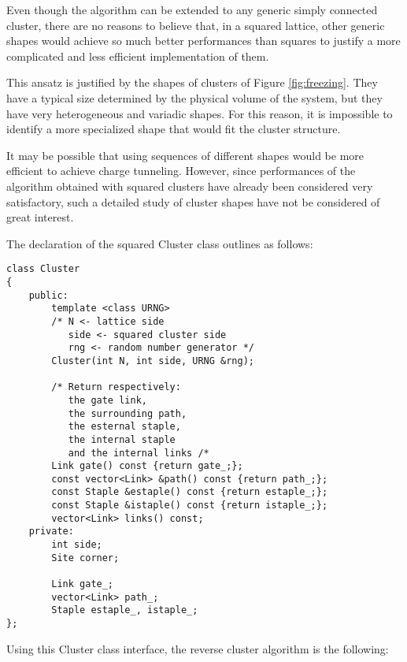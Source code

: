 Even though the algorithm can be extended to any generic simply connected cluster,
there are no reasons to believe that, in a squared lattice,
other generic shapes would achieve so much better performances than squares
to justify a more complicated and less efficient implementation of them.

This ansatz is justified by the shapes of clusters of Figure \ref{fig:freezing}.
They have a typical size determined by the physical volume of the system,
but they have very heterogeneous and variadic shapes. 
For this reason,
it is impossible to identify a more specialized shape that would fit the cluster structure.

It may be possible that using sequences of different shapes would be more efficient to achieve charge tunneling.
However, since performances of the algorithm obtained with squared clusters have already been considered very satisfactory,
such a detailed study of cluster shapes have not be considered of great interest.

The declaration of the squared {\ttfamily Cluster} class outlines as follows:

\begin{lstlisting}[caption={Cluster class declaration}]
class Cluster
{
    public:
        template <class URNG>
        /* N <- lattice side
           side <- squared cluster side
           rng <- random number generator */
        Cluster(int N, int side, URNG &rng);

        /* Return respectively:
           the gate link,
           the surrounding path,
           the esternal staple,
           the internal staple
           and the internal links /*
        Link gate() const {return gate_;};
        const vector<Link> &path() const {return path_;};
        const Staple &estaple() const {return estaple_;};
        const Staple &istaple() const {return istaple_;};
        vector<Link> links() const;
    private:
        int side;
        Site corner;

        Link gate_;
        vector<Link> path_;
        Staple estaple_, istaple_;
};
\end{lstlisting}

Using this {\ttfamily Cluster} class interface, the reverse cluster algorithm is the following:

